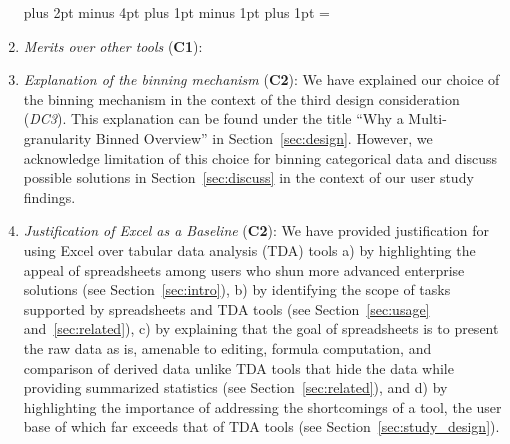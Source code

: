 \begin{enumerate}
\leftmargin=25pt \rightmargin=0pt   \itemindent=0pt \listparindent=0pt \topsep=0pt plus 2pt minus 4pt \partopsep=0pt plus 1pt minus 1pt \parsep=0pt plus 1pt \itemsep=\parsep

\item \textit{Merits over other tools} (\textbf{C1}):  

\item \textit{Explanation of the binning mechanism} (\textbf{C2}): We have explained our choice of the binning mechanism in the context of the third design consideration (\emph{DC3}). This explanation can be found under the title ``Why a Multi-granularity Binned Overview'' in Section~\ref{sec:design}.  However, we acknowledge limitation of this choice for binning categorical data and discuss possible solutions in Section~\ref{sec:discuss} in the context of our user study findings. 

\item \textit{Justification of Excel as a Baseline} (\textbf{C2}):
We have provided justification for using Excel over tabular data analysis (TDA) tools a) by highlighting the appeal of spreadsheets among users who shun more advanced enterprise solutions (see Section~\ref{sec:intro}), b) by identifying the scope of tasks supported by spreadsheets and TDA tools (see Section~\ref{sec:usage} and~\ref{sec:related}), c) by explaining that the goal of spreadsheets is to present the raw data as is, amenable to editing, formula computation, and comparison of derived data unlike TDA tools that hide the data while providing summarized statistics (see Section~\ref{sec:related}), and d) by highlighting the importance of addressing the shortcomings of a tool, the user base of which far exceeds that of TDA tools (see Section~\ref{sec:study_design}). 


\end{enumerate}
